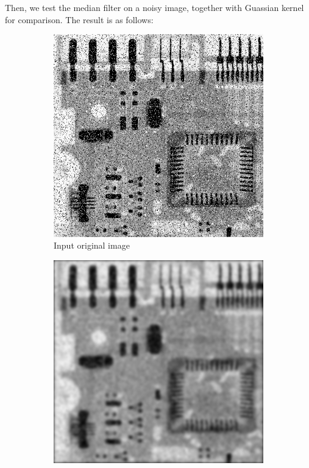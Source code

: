 \documentclass[UTF8]{ctexart}
\begin{document}
Then, we test the median filter on a noisy image, together with Guassian kernel for comparison. The result is as follows:\\
\begin{figure}[htbp]
    \centering
    \begin{subfigure}{0.3\textwidth}
        \centering
        \includegraphics[width=\linewidth]{ckt_board.png}
        \caption{Input original image}
    \end{subfigure}%
    \hfill
    \begin{subfigure}{0.3\textwidth}
        \centering
        \includegraphics[width=\linewidth]{ckt_gauss_smooth.png}

\end{subfigure}
\end{figure}
\end{document}
